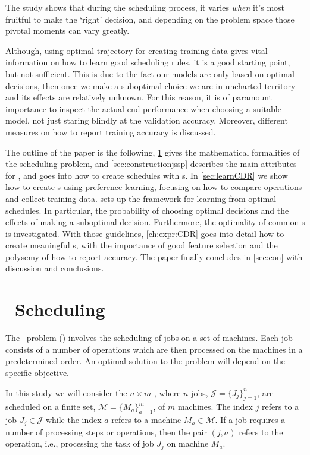 \documentclass[smallextended]{svjour3}
\begin{document}
The study shows that during the scheduling process, it varies \emph{when} it's 
most fruitful to make the `right' decision, and depending on the problem space 
those pivotal moments can vary greatly. 

Although, using optimal trajectory for creating training data gives vital 
information on how to learn good scheduling rules, it is a good starting point, 
but not sufficient. This is due to the fact our models are only based on 
optimal decisions, then once we make a suboptimal choice we are in uncharted 
territory and its effects are relatively unknown. For this reason, it is of 
paramount importance to inspect the actual end-performance when choosing a 
suitable model, not just staring blindly at the validation accuracy. Moreover, 
different measures on how to report training accuracy is discussed.

The outline of the paper is the following, \cref{sec:problemdef} gives the 
mathematical formalities of the scheduling problem, and  
\cref{sec:constructionjssp} describes the main attributes for \jsp, 
and goes into how to create schedules with \dr s. In \cref{sec:learnCDR} we 
show how to create \cdr s using preference learning, focusing on how to 
compare operations and collect training data.
 sets up the framework for learning from optimal schedules. In 
particular, the probability of choosing optimal decisions and the effects of 
making a suboptimal decision. 
Furthermore, the optimality of common \sdr s is investigated.
With those guidelines, \cref{ch:expr:CDR} goes into detail how to create 
meaningful \cdr s, with the importance of good feature 
selection and the polysemy of how to report accuracy. 
The paper finally concludes in \cref{sec:con} with discussion and conclusions.


\section{\Jsp~Scheduling}\label{sec:problemdef}
The \jsp~problem (\JSP) involves the scheduling of jobs on a set of 
machines. Each job consists of a number of operations which are then processed 
on the machines in a predetermined order. An optimal solution to the problem 
will depend on the specific objective. 

In this study we will consider the $n\times m$ \JSP, where $n$ jobs, 
$\mathcal{J}=\{J_j\}_{j=1}^n$, are scheduled on a finite set, 
$\mathcal{M}=\{M_a\}_{a=1}^m$, of $m$ machines. The index $j$ refers to a job 
$J_j\in\mathcal{J}$ while the index  $a$ refers to a machine 
$M_a\in\mathcal{M}$. 
If a job requires a number of processing steps or operations, then the pair 
$(j,a)$ refers to the operation, i.e., processing the task of job $J_j$ on 
machine $M_a$. 
\end{document}

